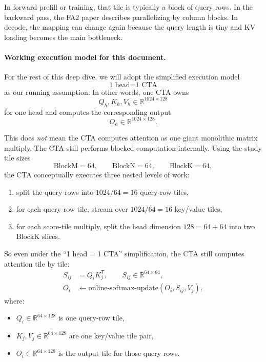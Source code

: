 \documentclass[11pt]{article}
\newcommand{\R}{\mathbb{R}}
\newcommand{\trans}{\mathsf{T}}
\begin{document}
In forward prefill or training, that tile is typically a block of query rows.
In the backward pass, the FA2 paper describes parallelizing by column blocks.
In decode, the mapping can change again because the query length is tiny and KV
loading becomes the main bottleneck.

\paragraph{Working execution model for this document.}
For the rest of this deep dive, we will adopt the simplified execution model
\[
\text{1 head} = \text{1 CTA}
\]
as our running assumption. In other words, one CTA owns
\[
Q_h, K_h, V_h \in \R^{1024 \times 128}
\]
for one head and computes the corresponding output
\[
O_h \in \R^{1024 \times 128}.
\]

This does \emph{not} mean the CTA computes attention as one giant monolithic
matrix multiply. The CTA still performs blocked computation internally. Using
the study tile sizes
\[
\mathrm{BlockM} = 64, \qquad \mathrm{BlockN} = 64, \qquad \mathrm{BlockK} = 64,
\]
the CTA conceptually executes three nested levels of work:

\begin{enumerate}
    \item split the query rows into $1024 / 64 = 16$ query-row tiles,
    \item for each query-row tile, stream over $1024 / 64 = 16$ key/value
    tiles,
    \item for each score-tile multiply, split the head dimension
    $128 = 64 + 64$ into two $\mathrm{BlockK}$ slices.
\end{enumerate}

So even under the ``1 head = 1 CTA'' simplification, the CTA still computes
attention tile by tile:
\begin{align}
S_{ij} &= Q_i K_j^\trans, \qquad S_{ij} \in \R^{64 \times 64}, \\
O_i &\leftarrow \text{online-softmax-update}(O_i, S_{ij}, V_j),
\end{align}
where:
\begin{itemize}
    \item $Q_i \in \R^{64 \times 128}$ is one query-row tile,
    \item $K_j, V_j \in \R^{64 \times 128}$ are one key/value tile pair,
    \item $O_i \in \R^{64 \times 128}$ is the output tile for those query rows.
\end{itemize}
\end{document}
